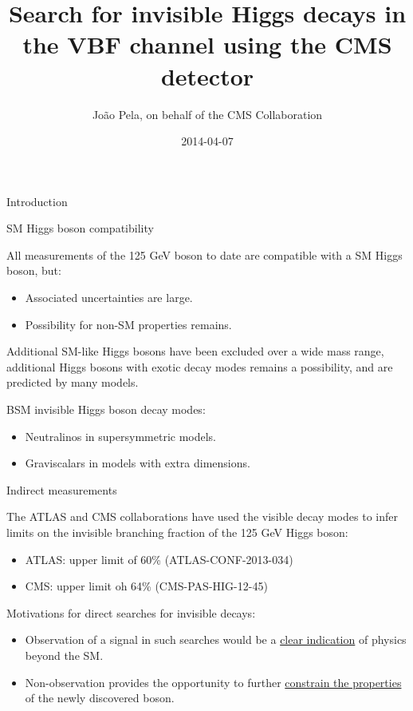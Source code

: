 \documentclass[8pt]{beamer}
\author[J. Pela]{João Pela, on behalf of the CMS Collaboration}
\title[Search for VBF Higgs $\rightarrow$ Inv at CMS]{Search for invisible Higgs decays in the VBF channel using the CMS detector}
\institute[ICL]{Imperial College London}
\date{2014-04-07}
\newcommand\Fontvi{\fontsize{6}{7.2}\selectfont}
\begin{document}
\setlength{\unitlength}{1mm}

\begin{frame}
  \titlepage
\end{frame}

\begin{frame}{Introduction}
\Fontvi
 
\begin{block}{SM Higgs boson compatibility}
 
All measurements of the 125 GeV boson to date are compatible with a SM Higgs boson, but:
\begin{itemize}
 \item Associated uncertainties are large.
 \item Possibility for non-SM properties remains.
\end{itemize}

Additional SM-like Higgs bosons have been excluded over a wide mass range, additional Higgs bosons with exotic decay modes remains a possibility, and are predicted by many models.

\end{block}

\begin{block}{BSM invisible Higgs boson decay modes:}

\begin{itemize}
 \item Neutralinos in supersymmetric models.
 \item Graviscalars in models with extra dimensions. 
\end{itemize}

\end{block}

\begin{block}{Indirect measurements}

The ATLAS and CMS collaborations have used the visible decay modes to infer limits on the invisible branching fraction of the 125 GeV Higgs boson:
\begin{itemize}
 \item ATLAS: upper limit of 60\% (ATLAS-CONF-2013-034) 
 \item CMS: upper limit oh 64\% (CMS-PAS-HIG-12-45)
\end{itemize}

\end{block}

\begin{block}{Motivations for direct searches for invisible decays:}

\begin{itemize}
 \item Observation of a signal in such searches would be a \uline{clear indication} of physics beyond the SM.
 \item Non-observation provides the opportunity to further \uline{constrain the properties} of the newly discovered boson.
\end{itemize}

\end{block}
 
\end{frame}
\end{document}
